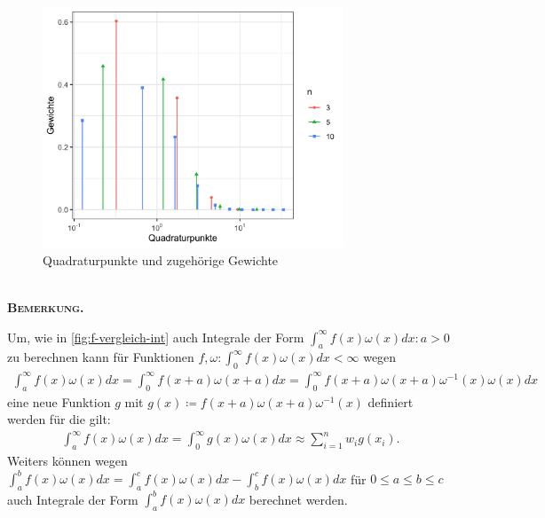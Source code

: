 \documentclass[12pt,a4paper]{scrartcl}
\numberwithin{equation}{section}
\numberwithin{myalgctr}{section}
\numberwithin{mytheoremctr}{subsection}
\numberwithin{mykorollarctr}{subsection}
\numberwithin{mylemmactr}{subsection}
\numberwithin{mybeispielctr}{subsection}
\newenvironment{bemerkung}{%
	\bigskip\noindent%
	\textsc{\textbf{\\Bemerkung.}}%
	\indent
}{\par\bigskip}  %
\begin{document}
	\begin{figure}[H]
		\begin{center}
			\includegraphics[width=0.8\textwidth]{../plots/quadraturpunkte-n-zusammen.png}
		\end{center}
		\caption{Quadraturpunkte und zugeh\"orige Gewichte}
		\label{fig:quadraturpunkte}
	\end{figure}

	\begin{bemerkung}
		Um, wie in \cref{fig:f-vergleich-int} auch Integrale der Form $\int_{a}^{\infty}f(x)\omega(x)dx:a>0$ zu berechnen kann f\"ur Funktionen $f,\omega:\int_{0}^{\infty}f(x)\omega(x)dx<\infty$ wegen \autocite[vgl.][278]{ana2}
		\begin{align*}
		\int_{a}^{\infty}f(x)\omega(x)dx = \int_{0}^{\infty}f(x+a)\omega(x+a)dx = \int_{0}^{\infty}f(x+a)\omega(x+a)\omega^{-1}(x)\omega(x)dx
		\end{align*}
		eine neue Funktion $g$ mit $g(x) \coloneqq f(x+a)\omega(x+a)\omega^{-1}(x)$ definiert werden f\"ur die gilt:
		\begin{align*}
		\int_{a}^{\infty}f(x)\omega(x)dx = \int_{0}^{\infty}g(x)\omega(x)dx \approx  \sum_{i=1}^{n}w_ig(x_i).
		\end{align*}
		Weiters k\"onnen wegen $\int_{a}^{b}f(x)\omega(x)dx = \int_{a}^{c}f(x)\omega(x)dx - \int_{b}^{c}f(x)\omega(x)dx$ f\"ur $0\leq a\leq b\leq c$ auch Integrale der Form $\int_{a}^{b}f(x)\omega(x)dx$ berechnet werden.
	\end{bemerkung}
	
	\newpage
\end{document}
